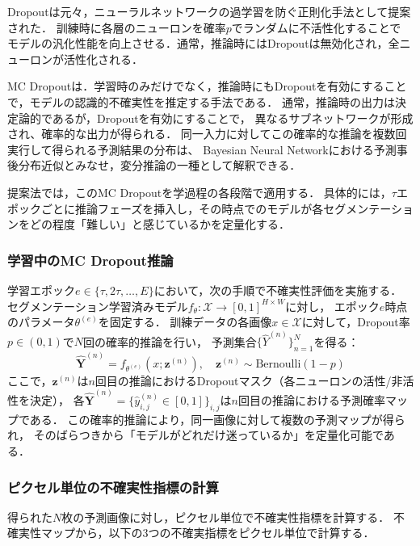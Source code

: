 \documentclass[10pt, a4paper, twocolumn]{jarticle}
\begin{document}
Dropoutは元々，ニューラルネットワークの過学習を防ぐ正則化手法として提案された\cite{JMLR:v15:srivastava14a}．
訓練時に各層のニューロンを確率$p$でランダムに不活性化することで
モデルの汎化性能を向上させる．通常，推論時にはDropoutは無効化され，全ニューロンが活性化される．

MC Dropoutは．学習時のみだけでなく，推論時にもDropoutを有効にすることで，モデルの認識的不確実性を推定する手法である．
通常，推論時の出力は決定論的であるが，Dropoutを有効にすることで，
異なるサブネットワークが形成され、確率的な出力が得られる．
同一入力に対してこの確率的な推論を複数回実行して得られる予測結果の分布は、
Bayesian Neural Networkにおける予測事後分布近似とみなせ，変分推論の一種として解釈できる．

提案法では，このMC Dropoutを学過程の各段階で適用する．
具体的には，$\tau$エポックごとに推論フェーズを挿入し，その時点でのモデルが各セグメンテーションをどの程度「難しい」と感じているかを定量化する．

\subsubsection{学習中のMC Dropout推論}
学習エポック$e \in \{\tau, 2\tau, \ldots, E\}$において，次の手順で不確実性評価を実施する．
セグメンテーション学習済みモデル$f_{\theta}: \mathcal{X} \rightarrow [0,1]^{H \times W}$に対し，
エポック$e$時点のパラメータ$\theta^{(e)}$を固定する．
訓練データの各画像$x \in \mathcal{X}$に対して，Dropout率$p \in (0,1)$で$N$回の確率的推論を行い，
予測集合$\{\hat{Y}^{(n)}\}_{n=1}^{N}$を得る：
%
\begin{equation}
  \hat{\mathbf{Y}}^{(n)} = f_{\theta^{(e)}}(x; \mathbf{z}^{(n)}), \quad \mathbf{z}^{(n)} \sim \text{Bernoulli}(1-p)
\end{equation}
%
ここで，$\mathbf{z}^{(n)}$は$n$回目の推論におけるDropoutマスク（各ニューロンの活性/非活性を決定），
各$\hat{\mathbf{Y}}^{(n)} = \{\hat{y}_{i,j}^{(n)} \in [0,1]\}_{i,j}$は$n$回目の推論における予測確率マップである．
この確率的推論により，同一画像に対して複数の予測マップが得られ，
そのばらつきから「モデルがどれだけ迷っているか」を定量化可能である．

\subsubsection{ピクセル単位の不確実性指標の計算}
得られた$N$枚の予測画像に対し，ピクセル単位で不確実性指標を計算する．
不確実性マップから，以下の3つの不確実指標をピクセル単位で計算する．
\end{document}
